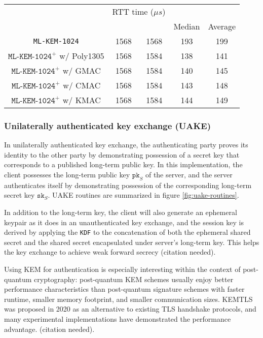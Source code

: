 \documentclass[journal=tches,submission]{iacrtrans}
\newcommand{\pk}{\texttt{pk}}
\newcommand{\sk}{\texttt{sk}}
\newcommand{\us}{\mu s}
\begin{document}
\begin{table}[H]
\begin{tabular}{|c|c|c|c|c|}
        & \multicolumn{2}{|c|}{RTT time ($\us$)} \\
        \cline{4-5}
        & & & Median & Average \\
        \hline
        \texttt{ML-KEM-1024} & 1568 & 1568 & 193 & 199 \\
        \hline
        $\texttt{ML-KEM-1024}^+$ w/ Poly1305 & 1568 & 1584 & 138 & 141 \\
        \hline
        $\texttt{ML-KEM-1024}^+$ w/ GMAC & 1568 & 1584 & 140 & 145 \\
        \hline
        $\texttt{ML-KEM-1024}^+$ w/ CMAC & 1568 & 1584 & 143 & 148 \\
        \hline
        $\texttt{ML-KEM-1024}^+$ w/ KMAC & 1568 & 1584 & 144 & 149 \\
        \hline
    \end{tabular}
\end{table}

\subsubsection{Unilaterally authenticated key exchange (UAKE)}\label{sec:uakex}
In unilaterally authenticated key exchange, the authenticating party proves its identity to the other party by demonstrating possession of a secret key that corresponds to a published long-term public key. In this implementation, the client possesses the long-term public key $\pk_S$ of the server, and the server authenticates itself by demonstrating possession of the corresponding long-term secret key $\sk_S$. UAKE routines are summarized in figure \ref{fig:uake-routines}.

In addition to the long-term key, the client will also generate an ephemeral keypair as it does in an unauthenticated key exchange, and the session key is derived by applying the \texttt{KDF} to the concatenation of both the ephemeral shared secret and the shared secret encapsulated under server's long-term key. This helps the key exchange to achieve weak forward secrecy (citation needed).

Using KEM for authentication is especially interesting within the context of post-quantum cryptography: post-quantum KEM schemes usually enjoy better performance characteristics than post-quantum signature schemes with faster runtime, smaller memory footprint, and smaller communication sizes. KEMTLS was proposed in 2020 as an alternative to existing TLS handshake protocols, and many experimental implementations have demonstrated the performance advantage. (citation needed).
\end{document}
